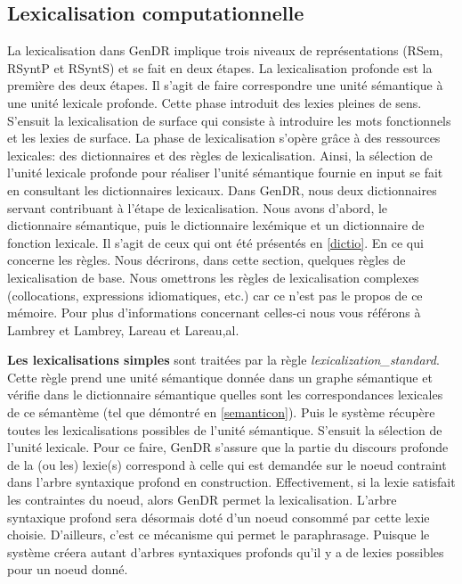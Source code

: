 \subsection{Lexicalisation computationnelle}
La lexicalisation dans GenDR implique trois niveaux de représentations (RSem, RSyntP et RSyntS) et se fait en deux étapes. La lexicalisation profonde est la première des deux étapes. Il s'agit de faire correspondre une unité sémantique à une unité lexicale profonde. Cette phase introduit des lexies pleines de sens. S'ensuit la lexicalisation de surface qui consiste à introduire les mots fonctionnels et les lexies de surface. La phase de lexicalisation s'opère grâce à des ressources lexicales: des dictionnaires et des règles de lexicalisation. Ainsi, la sélection de l'unité lexicale profonde pour réaliser l'unité sémantique fournie en input se fait en consultant les dictionnaires lexicaux. Dans GenDR, nous deux dictionnaires servant contribuant à l'étape de lexicalisation. Nous avons d'abord, le dictionnaire sémantique, puis le dictionnaire lexémique et un dictionnaire de fonction lexicale. Il s'agit de ceux qui ont été présentés en \ref{dictio}. En ce qui concerne les règles. Nous décrirons, dans cette section, quelques règles de lexicalisation de base. Nous omettrons les règles de lexicalisation complexes (collocations, expressions idiomatiques, etc.) car ce n'est pas le propos de ce mémoire. Pour plus d'informations concernant celles-ci nous vous référons à Lambrey et Lambrey, Lareau et Lareau,al.

\textbf{Les lexicalisations simples}
sont traitées par la règle \emph{lexicalization\_standard}. Cette règle prend une unité sémantique donnée dans un graphe sémantique et vérifie dans le dictionnaire sémantique quelles sont les correspondances lexicales de ce sémantème (tel que démontré en \ref{semanticon}). Puis le système récupère toutes les lexicalisations possibles de l'unité sémantique. S'ensuit la sélection de l'unité lexicale. Pour ce faire, GenDR s'assure que la partie du discours profonde de la (ou les) lexie(s) correspond à celle qui est demandée sur le noeud contraint dans l'arbre syntaxique profond en construction. Effectivement, si la lexie satisfait les contraintes du noeud, alors GenDR permet la lexicalisation. L'arbre syntaxique profond sera désormais doté d'un noeud consommé par cette lexie choisie. D'ailleurs, c'est ce mécanisme qui permet le paraphrasage. Puisque le système créera autant d'arbres syntaxiques profonds qu'il y a de lexies possibles pour un noeud donné. 

